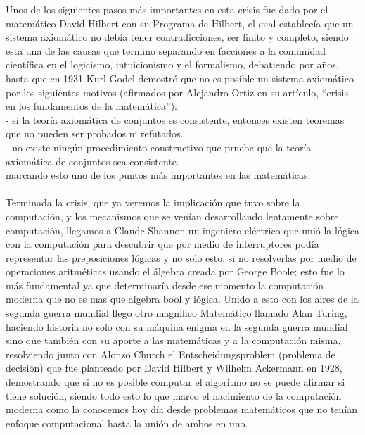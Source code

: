 \documentclass{letter}
\begin{document}
Unos de los siguientes pasos más importantes en esta crisis fue dado por el matemático David Hilbert con su Programa de Hilbert, el cual establecía que un sistema axiomático no debía tener contradicciones, ser finito y completo, siendo esta una de las causas que termino separando en facciones a la comunidad científica en el logicismo, intuicionismo y el formalismo, debatiendo por años, hasta que en 1931 Kurl Godel demostró que no es posible un sistema axiomático por los siguientes motivos  (afirmados por Alejandro Ortiz en su artículo, “crisis en los fundamentos de la matemática”):\\
- si la teoría axiomática de conjuntos es consistente, entonces existen teoremas que no pueden ser probados ni refutados.\\
- no existe ningún procedimiento constructivo que pruebe que la teoría axiomática de conjuntos sea consistente.\\
marcando esto uno de los puntos más importantes en las matemáticas.\\\\
Terminada la crisis, que ya veremos la implicación que tuvo sobre la computación, y los mecanismos que se venían desarrollando lentamente sobre computación, llegamos a Claude Shannon un ingeniero eléctrico que unió la lógica con la computación para descubrir que por medio de interruptores podía representar las preposiciones lógicas y no solo esto, si no resolverlas por medio de operaciones aritméticas usando el álgebra creada por George Boole; esto fue lo más fundamental ya que determinaría desde ese momento la computación moderna que no es mas que algebra bool y lógica. Unido a esto con los aires de la segunda guerra mundial llego otro magnifico Matemático llamado Alan Turing, haciendo historia no solo con su máquina enigma en la segunda guerra mundial sino que también con su aporte a las matemáticas  y a la computación misma, resolviendo  junto con Alonzo Church el Entscheidungsproblem (problema de decisión) que fue  planteado por David Hilbert y Wilhelm Ackermann en 1928, demostrando que si no es posible computar el algoritmo no se puede afirmar si tiene solución, siendo todo esto lo que marco el nacimiento de la computación moderna como la conocemos hoy día desde problemas matemáticos que no tenían enfoque computacional hasta la unión de ambos en uno.




\\
\end{document}
